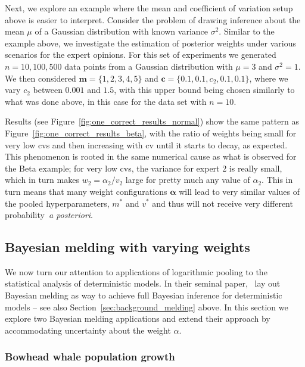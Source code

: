 \documentclass[12pt]{article}
\begin{document}
Next, we explore an example where the mean and coefficient of variation setup above is easier to interpret.
Consider the problem of drawing inference about the mean $\mu$ of a Gaussian distribution with known variance $\sigma^2$.
Similar to the example above, we investigate the estimation of posterior weights under various scenarios for the expert opinions.
For this set of experiments we generated $n=10, 100, 500$ data points from a Gaussian distribution with $\mu=3$ and  $\sigma^2 = 1$.
We then considered $\boldsymbol{m} = \{1, 2, 3, 4, 5\}$ and $\boldsymbol c = \{0.1, 0.1, c_2, 0.1, 0.1 \}$, where we vary $c_2$ between $0.001$ and $1.5$, with this upper bound being chosen similarly to what was done above, in this case for the data set with $n=10$.

Results (see Figure~\ref{fig:one_correct_results_normal}) show the same pattern as Figure~\ref{fig:one_correct_results_beta}, with the ratio of weights being small for very low cvs and then increasing with cv until it starts to decay, as expected.
This phenomenon is rooted in the same numerical cause as what is observed for the Beta example; for very low cvs, the variance for expert 2 is really small, which in turn makes $w_2 = \alpha_2/v_2$ large for pretty much any value of $\alpha_2$.
This in turn means that many weight configurations $\boldsymbol{\alpha}$ will lead to very similar values of the pooled hyperparameters, $m^\ast$ and $v^\ast$ and thus will not receive very different probability~\textit{a posteriori}.

\subsection{Bayesian melding with varying weights}
\label{sec:melding_apps}

We now turn our attention to applications of logarithmic pooling to the statistical analysis of deterministic models.
In their seminal paper,~\textcite{Poole2000} lay out Bayesian melding as way to achieve full Bayesian inference for deterministic models -- see also Section~\ref{sec:background_melding} above.
In this section we explore two Bayesian melding applications and extend their approach by accommodating uncertainty about the weight $\alpha$. 

\subsubsection{Bowhead whale population growth}
\label{sec:bowhead}
\end{document}
